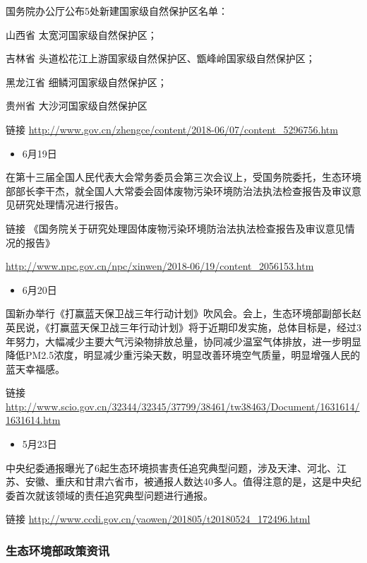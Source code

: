 \documentclass[
]{book}
\providecommand{\tightlist}{%
  \setlength{\itemsep}{0pt}\setlength{\parskip}{0pt}}
\begin{document}
国务院办公厅公布5处新建国家级自然保护区名单：

山西省 太宽河国家级自然保护区；

吉林省 头道松花江上游国家级自然保护区、甑峰岭国家级自然保护区；

黑龙江省 细鳞河国家级自然保护区；

贵州省 大沙河国家级自然保护区

链接 \url{http://www.gov.cn/zhengce/content/2018-06/07/content_5296756.htm}

\begin{itemize}
\tightlist
\item
  6月19日
\end{itemize}

在第十三届全国人民代表大会常务委员会第三次会议上，受国务院委托，生态环境部部长李干杰，就全国人大常委会固体废物污染环境防治法执法检查报告及审议意见研究处理情况进行报告。

链接 《国务院关于研究处理固体废物污染环境防治法执法检查报告及审议意见情况的报告》

\url{http://www.npc.gov.cn/npc/xinwen/2018-06/19/content_2056153.htm}

\begin{itemize}
\tightlist
\item
  6月20日
\end{itemize}

国新办举行《打赢蓝天保卫战三年行动计划》吹风会。会上，生态环境部副部长赵英民说，《打赢蓝天保卫战三年行动计划》将于近期印发实施，总体目标是，经过3年努力，大幅减少主要大气污染物排放总量，协同减少温室气体排放，进一步明显降低PM2.5浓度，明显减少重污染天数，明显改善环境空气质量，明显增强人民的蓝天幸福感。

链接 \url{http://www.scio.gov.cn/32344/32345/37799/38461/tw38463/Document/1631614/1631614.htm}

\begin{itemize}
\tightlist
\item
  5月23日
\end{itemize}

中央纪委通报曝光了6起生态环境损害责任追究典型问题，涉及天津、河北、江苏、安徽、重庆和甘肃六省市，被通报人数达40多人。值得注意的是，这是中央纪委首次就该领域的责任追究典型问题进行通报。

链接 \url{http://www.ccdi.gov.cn/yaowen/201805/t20180524_172496.html}

\hypertarget{ux751fux6001ux73afux5883ux90e8ux653fux7b56ux8d44ux8baf-2}{%
\subsubsection*{生态环境部政策资讯}\label{ux751fux6001ux73afux5883ux90e8ux653fux7b56ux8d44ux8baf-2}}
\end{document}
